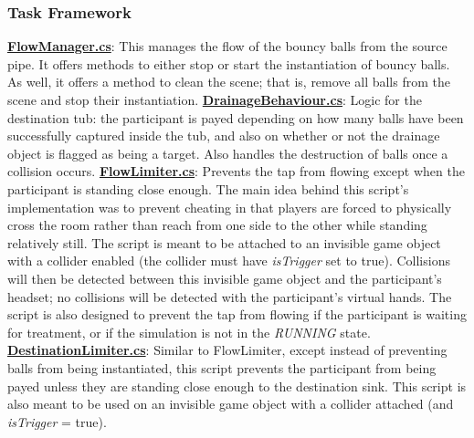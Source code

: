 \documentclass{article}
\begin{document}
\subsubsection{Task Framework}
\href{https://bit.ly/2WrbyxT}{\textbf{FlowManager.cs}}: This manages the flow of the bouncy balls from the source pipe. It offers methods to either stop or start the instantiation of bouncy balls. As well, it offers a method to clean the scene; that is, remove all balls from the scene and stop their instantiation. \newline \newline 
\href{https://bit.ly/2YtMEjd}{\textbf{DrainageBehaviour.cs}}: Logic for the destination tub: the participant is payed depending on how many balls have been successfully captured inside the tub, and also on whether or not the drainage object is flagged as being a target. Also handles the destruction of balls once a collision occurs. \newline \newline 
\href{https://bit.ly/2TUX1h4}{\textbf{FlowLimiter.cs}}: Prevents the tap from flowing except when the participant is standing close enough. The main idea behind this script's implementation was to prevent cheating in that players are forced to physically cross the room rather than reach from one side to the other while standing relatively still. The script is meant to be attached to an invisible game object with a collider enabled (the collider must have \textit{isTrigger} set to true). Collisions will then be detected between this invisible game object and the participant's headset; no collisions will be detected with the participant's virtual hands. The script is also designed to prevent the tap from flowing if the participant is waiting for treatment, or if the simulation is not in the \textit{RUNNING} state. \newline \newline
\href{https://bit.ly/2JGhr8M}{\textbf{DestinationLimiter.cs}}: Similar to FlowLimiter, except instead of preventing balls from being instantiated, this script prevents the participant from being payed unless they are standing close enough to the destination sink. This script is also meant to be used on an invisible game object with a collider attached (and \textit{isTrigger} = true). 
\end{document}
